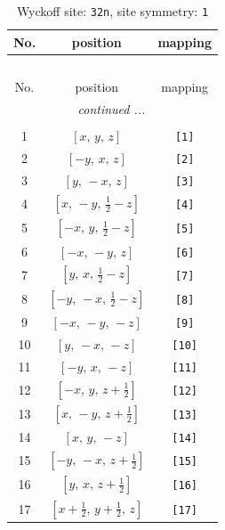 \documentclass[fleqn,8pt]{jsarticle}
\begin{document}
\renewcommand{\arraystretch}{1.2}
\begin{longtable}{ccc}
\caption{Wyckoff site: {\tt 32n}, site symmetry: {\tt 1}}
 \\
 \hline \hline
No. & position & mapping \\ \hline \endfirsthead

\multicolumn{2}{l}{\tablename\ \thetable{}} \\
 \hline \hline
No. & position & mapping \\ \hline \endhead

 \hline \hline
\multicolumn{2}{r}{\footnotesize\it continued ...} \\ \endfoot

 \hline \hline
\multicolumn{2}{r}{} \\ \endlastfoot

1 & $\left[ x,\, y,\, z \right]$ & {\tt [1]} \\ \hline
2 & $\left[ - y,\, x,\, z \right]$ & {\tt [2]} \\ \hline
3 & $\left[ y,\, - x,\, z \right]$ & {\tt [3]} \\ \hline
4 & $\left[ x,\, - y,\, \frac{1}{2} - z \right]$ & {\tt [4]} \\ \hline
5 & $\left[ - x,\, y,\, \frac{1}{2} - z \right]$ & {\tt [5]} \\ \hline
6 & $\left[ - x,\, - y,\, z \right]$ & {\tt [6]} \\ \hline
7 & $\left[ y,\, x,\, \frac{1}{2} - z \right]$ & {\tt [7]} \\ \hline
8 & $\left[ - y,\, - x,\, \frac{1}{2} - z \right]$ & {\tt [8]} \\ \hline
9 & $\left[ - x,\, - y,\, - z \right]$ & {\tt [9]} \\ \hline
10 & $\left[ y,\, - x,\, - z \right]$ & {\tt [10]} \\ \hline
11 & $\left[ - y,\, x,\, - z \right]$ & {\tt [11]} \\ \hline
12 & $\left[ - x,\, y,\, z + \frac{1}{2} \right]$ & {\tt [12]} \\ \hline
13 & $\left[ x,\, - y,\, z + \frac{1}{2} \right]$ & {\tt [13]} \\ \hline
14 & $\left[ x,\, y,\, - z \right]$ & {\tt [14]} \\ \hline
15 & $\left[ - y,\, - x,\, z + \frac{1}{2} \right]$ & {\tt [15]} \\ \hline
16 & $\left[ y,\, x,\, z + \frac{1}{2} \right]$ & {\tt [16]} \\ \hline
17 & $\left[ x + \frac{1}{2},\, y + \frac{1}{2},\, z \right]$ & {\tt [17]} \\ \hline

\end{longtable}
\end{document}
